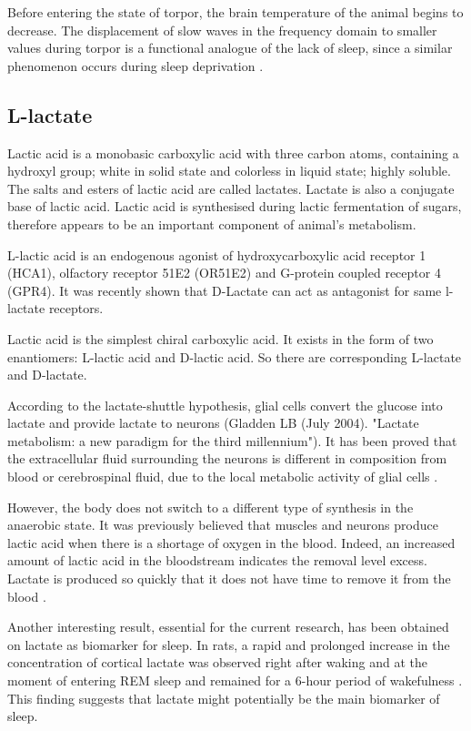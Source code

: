 \documentclass[14pt,a4paper]{scrartcl}
\begin{document}
Before entering the state of torpor, the brain temperature of the animal begins to decrease. The displacement of slow waves in the frequency domain to smaller values during torpor is a functional analogue of the lack of sleep, since a similar phenomenon occurs during sleep deprivation \cite{Silvani2018}. 

\subsection{L-lactate}
\label{sec:Introduction:L-lactate}

Lactic acid is a monobasic carboxylic acid with three carbon atoms, containing a hydroxyl group; white in solid state and colorless in liquid state; highly soluble. The salts and esters of lactic acid are called lactates. Lactate is also a conjugate base of lactic acid. Lactic acid is synthesised during lactic fermentation of sugars, therefore appears to be an important component of animal’s metabolism. 

L-lactic acid is an endogenous agonist of hydroxycarboxylic acid receptor 1 (HCA1), olfactory receptor 51E2 (OR51E2) and G-protein coupled receptor 4 (GPR4). It was recently shown \citep{Mosienko2018} that D-Lactate can act as antagonist for same l-lactate receptors.

Lactic acid is the simplest chiral carboxylic acid. It exists in the form of two enantiomers: L-lactic acid and D-lactic acid. So there are corresponding L-lactate and D-lactate. 

According to the lactate-shuttle hypothesis, glial cells convert the glucose into lactate and provide lactate to neurons (Gladden LB (July 2004). "Lactate metabolism: a new paradigm for the third millennium"). It has been proved that the extracellular fluid surrounding the neurons is different in composition from blood or cerebrospinal fluid, due to the local metabolic activity of glial cells \citep{Zilberter2010}. 

However, the body does not switch to a different type of synthesis in the anaerobic state. It was previously believed that muscles and neurons produce lactic acid when there is a shortage of oxygen in the blood. Indeed, an increased amount of lactic acid in the bloodstream indicates the removal level excess. Lactate is produced so quickly that it does not have time to remove it from the blood \citep{Brooks2010}.

Another interesting result, essential for the current research, has been obtained on lactate as biomarker for sleep. In rats, a rapid and prolonged increase in the concentration of cortical lactate was observed right after waking and at the moment of entering REM sleep and remained for a 6-hour period of wakefulness \citep{Naylor2012}. This finding suggests that lactate might potentially be the main biomarker of sleep. 
\end{document}
